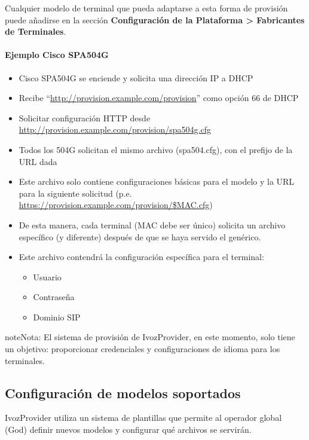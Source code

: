 \documentclass[letterpaper,10pt,spanish]{sphinxmanual}
\begin{document}
Cualquier modelo de terminal que pueda adaptarse a esta forma de provisión puede añadirse en la sección \textbf{Configuración de la Plataforma \textgreater{} Fabricantes de Terminales}.
\paragraph{Ejemplo Cisco SPA504G}
\begin{itemize}
\item {} 
Cisco SPA504G se enciende y solicita una dirección IP a DHCP

\item {} 
Recibe “\url{http://provision.example.com/provision}” como opción 66 de DHCP

\item {} 
Solicitar configuración HTTP desde \url{http://provision.example.com/provision/spa504g.cfg}

\item {} 
Todos los 504G solicitan el mismo archivo (spa504.cfg), con el prefijo de la URL dada

\item {} 
Este archivo solo contiene configuraciones básicas para el modelo y la URL para la siguiente solicitud (p.e. \url{https://provision.example.com/provision/\$MAC.cfg})

\item {} 
De esta manera, cada terminal (MAC debe ser único) solicita un archivo específico (y diferente) después de que se haya servido el genérico.

\item {} 
Este archivo contendrá la configuración específica para el terminal:
\begin{itemize}
\item {} 
Usuario

\item {} 
Contraseña

\item {} 
Dominio SIP

\end{itemize}

\end{itemize}

\begin{notice}{note}{Nota:}
El sistema de provisión de IvozProvider, en este momento, solo tiene un objetivo: proporcionar credenciales y configuraciones de idioma para los terminales.
\end{notice}


\subsection{Configuración de modelos soportados}
\label{administration_portal/platform/terminal_manufacturers:configuration-of-supported-models}
IvozProvider utiliza un sistema de plantillas que permite al operador global (God) definir nuevos modelos y configurar qué archivos se servirán.
\end{document}
